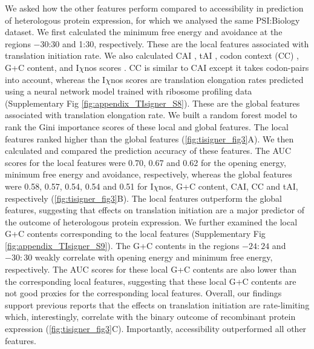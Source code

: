 We asked how the other features perform compared to accessibility in prediction of heterologous protein expression, for which we analysed the same PSI:Biology dataset. We first calculated the minimum free energy and avoidance at the regions −30:30 and 1:30, respectively. These are the local features associated with translation initiation rate. We also calculated CAI \cite{Sharp1987-ed}, tAI \cite{Tuller2010-ub}, codon context (CC) \cite{Ang2016-rv}, G+C content, and I$\chi$nos scores \cite{Tunney2018-sr}. CC is similar to CAI except it takes codon-pairs into account, whereas the I$\chi$nos scores are translation elongation rates predicted using a neural network model trained with ribosome profiling data (Supplementary Fig \ref{fig:appendix_TIsigner_S8}). These are the global features associated with translation elongation rate. We built a random forest model to rank the Gini importance scores of these local and global features. The local features ranked higher than the global features (\ref{fig:tisigner_fig3}A). We then calculated and compared the prediction accuracy of these features. The AUC scores for the local features were 0.70, 0.67 and 0.62 for the opening energy, minimum free energy and avoidance, respectively, whereas the global features were 0.58, 0.57, 0.54, 0.54 and 0.51 for I$\chi$nos, G+C content, CAI, CC and tAI, respectively (\ref{fig:tisigner_fig3}B). The local features outperform the global features, suggesting that effects on translation initiation are a major predictor of the outcome of heterologous protein expression. We further examined the local G+C contents corresponding to the local features (Supplementary Fig \ref{fig:appendix_TIsigner_S9}). The G+C contents in the regions $−24:24$ and $−30:30$ weakly correlate with opening energy and minimum free energy, respectively. The AUC scores for these local G+C contents are also lower than the corresponding local features, suggesting that these local G+C contents are not good proxies for the corresponding local features. Overall, our findings support previous reports that the effects on translation initiation are rate-limiting \cite{Kudla2009-tl,Tuller2015-ts} which, interestingly, correlate with the binary outcome of recombinant protein expression (\ref{fig:tisigner_fig3}C). Importantly, accessibility outperformed all other features.


